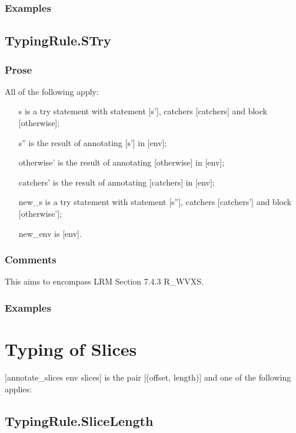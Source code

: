 \documentclass{book}
\begin{document}
    \subsubsection{Examples}

\subsection{TypingRule.STry}

    \subsubsection{Prose}
    All of the following apply:
   \begin{itemize}
   \item [s] is a try statement with statement [s'], catchers [catchers] and block [otherwise];
   \item [s''] is the result of annotating [s'] in [env];
   \item [otherwise'] is the result of annotating [otherwise] in [env];
   \item [catchers'] is the result of annotating [catchers] in [env];
   \item [new\_s] is a try statement with statement [s''], catchers [catchers'] and block [otherwise'];
   \item [new\_env] is [env].
   \end{itemize}

    \subsubsection{Comments}
    This aims to encompass LRM Section 7.4.3 R\_WVXS.

    \subsubsection{Examples}

\section{Typing of Slices}
[annotate\_slices env slices] is the pair [(offset, length)] and one of the
following applies:

\subsection{TypingRule.SliceLength}
\end{document}

